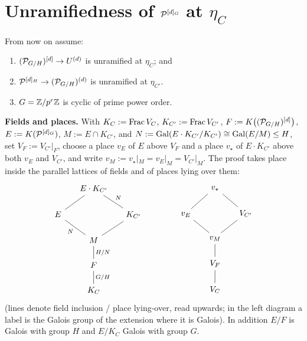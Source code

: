 \documentclass[11pt]{article}
\begin{document}
\section{Unramifiedness of \texorpdfstring{$\mathcal{P}^{[d]_G}$}{P\^{}[d]\_G} at \texorpdfstring{$\eta_C$}{eta\_C}}\label{sec:main}

From now on assume:

\begin{theorem}\label{thm:main}
\begin{enumerate}
  \item[\textnormal{(H1)}] $(\mathcal{P}_{G/H})^{[d]} \to U^{(d)}$ is unramified at
        $\eta_C$; and
  \item[\textnormal{(H2)}] $\mathcal{P}^{[d]_H} \to (\mathcal{P}_{G/H})^{(d)}$ is unramified at
        $\eta_{C'}$.
  \item[\textnormal{(H3)}] $G=\mathbb{Z}/p^r\mathbb{Z}$ is cyclic of prime power order.
\end{enumerate}
\end{theorem}

\medskip
\noindent\textbf{Fields and places.}  With
$K_C := \operatorname{Frac} V_C$, $K_{C'} := \operatorname{Frac} V_{C'}$,
$F := K\bigl((\mathcal{P}_{G/H})^{[d]}\bigr)$, $E := K(\mathcal{P}^{[d]_G})$,
$M := E \cap K_{C'}$, and
$N := \operatorname{Gal}(E \cdot K_{C'}/K_{C'}) \cong \operatorname{Gal}(E/M) \leq H$, set
$V_F := V_{C'}|_F$, choose a place $v_E$ of $E$ above $V_F$ and a place
$v_\star$ of $E \cdot K_{C'}$ above both $v_E$ and $V_{C'}$, and write
$v_M := v_\star|_M = v_E|_M = V_{C'}|_M$.  The proof takes place inside the
parallel lattices of fields and of places lying over them:
\[
\begin{tikzcd}[row sep=1.6em, column sep=1.4em]
 & E \cdot K_{C'} \arrow[dl, dash] \arrow[dr, dash, "N"] & \\
E \arrow[dr, dash, "N"'] & & K_{C'} \arrow[dl, dash] \\
 & M \arrow[d, dash, "H/N"] & \\
 & F \arrow[d, dash, "G/H"] & \\
 & K_C &
\end{tikzcd}
\qquad\qquad
\begin{tikzcd}[row sep=1.6em, column sep=1.4em]
 & v_\star \arrow[dl, dash] \arrow[dr, dash] & \\
v_E \arrow[dr, dash] & & V_{C'} \arrow[dl, dash] \\
 & v_M \arrow[d, dash] & \\
 & V_F \arrow[d, dash] & \\
 & V_C &
\end{tikzcd}
\]
(lines denote field inclusion / place lying-over, read upwards; in the left
diagram a label is the Galois group of the extension where it is Galois).  In
addition $E/F$ is Galois with group $H$ and $E/K_C$ Galois with group $G$.
\end{document}
